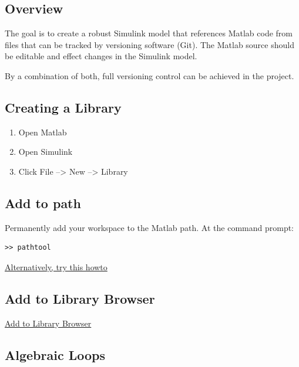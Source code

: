 \documentclass[]{article}
\providecommand{\tightlist}{%
  \setlength{\itemsep}{0pt}\setlength{\parskip}{0pt}}
\begin{document}
\subsection{Overview}\label{overview-3}

The goal is to create a robust Simulink model that references Matlab
code from files that can be tracked by versioning software (Git). The
Matlab source should be editable and effect changes in the Simulink
model.

By a combination of both, full versioning control can be achieved in the
project.

\subsection{Creating a Library}\label{creating-a-library}

\begin{enumerate}
\def\labelenumi{\arabic{enumi}.}
\tightlist
\item
  Open Matlab
\item
  Open Simulink
\item
  Click File --\textgreater{} New --\textgreater{} Library
\end{enumerate}

\subsection{Add to path}\label{add-to-path}

Permanently add your workspace to the Matlab path. At the command
prompt:

\begin{verbatim}
>> pathtool
\end{verbatim}

\href{http://www3.nd.edu/~nancy/Math20550/Homework/matlabpath.pdf}{Alternatively,
try this howto}

\subsection{Add to Library Browser}\label{add-to-library-browser}

\href{http://www.mathworks.com/help/simulink/ug/adding-libraries-to-the-library-browser.html}{Add
to Library Browser}

\subsection{Algebraic Loops}\label{algebraic-loops}
\end{document}
